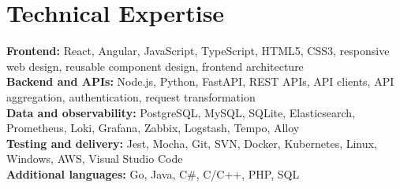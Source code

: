 \section{Technical Expertise}
\textbf{Frontend:} React, Angular, JavaScript, TypeScript, HTML5, CSS3,
responsive web design, reusable component design, frontend architecture\\
\textbf{Backend and APIs:} Node.js, Python, FastAPI, REST APIs, API clients,
API aggregation, authentication, request transformation\\
\textbf{Data and observability:} PostgreSQL, MySQL, SQLite, Elasticsearch,
Prometheus, Loki, Grafana, Zabbix, Logstash, Tempo, Alloy\\
\textbf{Testing and delivery:} Jest, Mocha, Git, SVN, Docker, Kubernetes,
Linux, Windows, AWS, Visual Studio Code\\
\textbf{Additional languages:} Go, Java, C\#, C/C++, PHP, SQL
